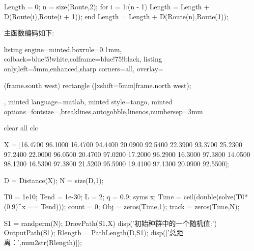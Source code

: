 \documentclass{article}
\begin{document}
\begin{homeworkProblem}
\begin{tcblisting}
    Length = 0;
    n = size(Route,2);
    for i = 1:(n - 1)
        Length = Length + D(Route(i),Route(i + 1));
    end
    Length = Length + D(Route(n),Route(1));    
\end{tcblisting}
    主函数编码如下:
    \begin{tcblisting}{listing engine=minted,boxrule=0.1mm,
        colback=blue!5!white,colframe=blue!75!black,
        listing only,left=5mm,enhanced,sharp corners=all,
        overlay={\begin{tcbclipinterior} (frame.south west)
        rectangle ([xshift=5mm]frame.north west);\end{tcbclipinterior}},
        minted language=matlab,
        minted style=tango,
        minted options={fontsize=\small,breaklines,autogobble,linenos,numbersep=3mm}}
clear all
clc

X = [16.4700   96.1000
     16.4700   94.4400
     20.0900   92.5400
     22.3900   93.3700
     25.2300   97.2400
     22.0000   96.0500
     20.4700   97.0200
     17.2000   96.2900
     16.3000   97.3800
     14.0500   98.1200
     16.5300   97.3800
     21.5200   95.5900
     19.4100   97.1300
     20.0900   92.5500];

D = Distance(X);  %
N = size(D,1);    %

T0 = 1e10;   %
Tend = 1e-30;  %
L = 2;    %
q = 0.9;    %
syms x;
Time = ceil(double(solve(T0*(0.9)^x == Tend)));    %
count = 0;        %
Obj = zeros(Time,1);         %
track = zeros(Time,N);       %

S1 = randperm(N);
DrawPath(S1,X)
disp('初始种群中的一个随机值:')
OutputPath(S1);
Rlength = PathLength(D,S1);
disp(['总距离：',num2str(Rlength)]);


\end{tcblisting}
\end{homeworkProblem}
\end{document}
